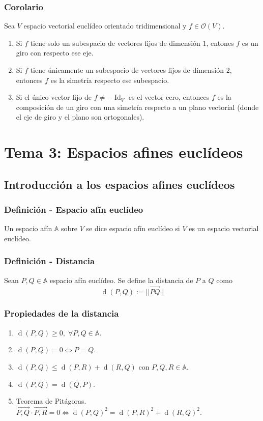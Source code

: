\documentclass[12pt, a4paper, ones, notitlepage, openany,titlepage]{article}
\newcommand{\distancia}[1]{\operatorname{d}(#1)}
\begin{document}
\subsubsection{Corolario}
Sea $V$ espacio vectorial euclídeo orientado tridimensional y $f \in \mathcal{O}(V)$.
\begin{enumerate}[label=(\arabic*)]
	\item Si $f$ tiene solo un subespacio de vectores fijos de dimensión $1$, entones $f$ es un giro con respecto ese eje.
	\item Si $f$ tiene únicamente un subespacio de vectores fijos de dimensión $2$, entonces $f$ es la simetría respecto ese subespacio.
	\item Si el único vector fijo de $f \neq -\operatorname{Id}_V$ es el vector cero, entonces $f$ es la composición de un giro con una simetría respecto a un plano vectorial (donde el eje de giro y el plano son ortogonales).
\end{enumerate}

\newpage

\section{Tema 3: Espacios afines euclídeos}

\subsection{Introducción a los espacios afines euclídeos}

\subsubsection{Definición - Espacio afín euclídeo}
Un espacio afín $\mathbb{A}$ sobre $V$ se dice espacio afín euclídeo si $V$ es un espacio vectorial euclídeo.

\subsubsection{Definición - Distancia}
Sean $P,Q \in \mathbb{A}$ espacio afín euclídeo. Se define la distancia de $P$ a $Q$ como
$$
\operatorname{d}(P,Q) := ||\overrightarrow{PQ}||
$$

\subsubsection{Propiedades de la distancia}
\begin{enumerate}[label=(\arabic*)]
	\item $\operatorname{d}(P,Q) \ge 0, \; \forall P,Q \in \mathbb{A}$.
	\item $\operatorname{d}(P,Q) = 0 \Longleftrightarrow P = Q$.
	\item $\operatorname{d}(P,Q) \le \operatorname{d}(P,R) + \operatorname{d}(R,Q) \text{ con } P,Q,R \in \mathbb{A}$.
	\item $\distancia{P,Q} = \distancia{Q,P}$.
	\item Teorema de Pitágoras. $\overrightarrow{P,Q} \cdot \overrightarrow{P,R} = 0 \Longleftrightarrow \distancia{P,Q}^2 = \distancia{P,R}^2 + \distancia{R,Q}^2$.
\end{enumerate}
\end{document}

